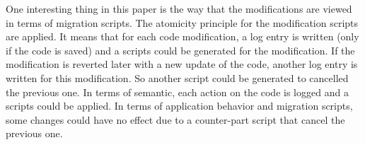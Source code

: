 One interesting thing in this paper is the way that the modifications are viewed in terms of migration scripts. The atomicity principle for the modification scripts are applied. It means that for each code modification, a log entry is written (only if the code is saved) and a scripts could be generated for the modification. If the modification is reverted later with a new update of the code, another log entry is written for this modification. So another script could be generated to cancelled the previous one. In terms of semantic, each action on the code is logged and a scripts could be applied. In terms of application behavior and migration scripts, some changes could have no effect due to a counter-part script that cancel the previous one.



